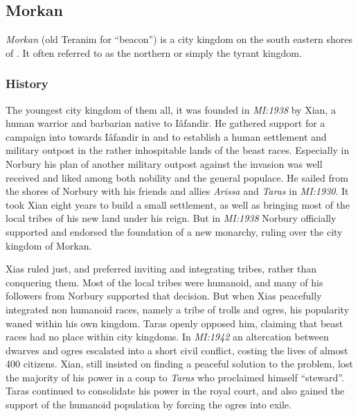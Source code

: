 \subsection{Morkan}
\label{sec:Morkan}


\emph{Morkan} (old Teranim for ``beacon'') is a city kingdom on the south
eastern shores of . It often referred to as the northern
or simply the tyrant kingdom.

\subsubsection{History}

The youngest city kingdom of them all, it was founded in \emph{MI:1938} by
Xian, a human warrior and barbarian native to Iâfandir. He gathered support
for a campaign into towards Iâfandir in  and
 to establish a human settlement and military outpost in
the rather inhospitable lands of the beast races. Especially in Norbury his
plan of another military outpost against the invasion was well received and
liked among both nobility and the general populace. He sailed from the shores
of Norbury with his friends and allies \emph{Arissa} and \emph{Taras} in
\emph{MI:1930}. It took Xian eight years to build a small settlement, as well
as bringing most of the local tribes of his new land under his reign. But in
\emph{MI:1938} Norbury officially supported and endorsed the foundation of a
new monarchy, ruling over the city kingdom of Morkan.

Xias ruled just, and preferred inviting and integrating tribes, rather than
conquering them. Most of the local tribes were humanoid, and many of his
followers from Norbury supported that decision. But when Xias peacefully
integrated non humanoid races, namely a tribe of trolls and ogres, his
popularity waned within his own kingdom. Taras openly opposed him, claiming
that beast races had no place within city kingdoms. In \emph{MI:1942} an
altercation between dwarves and ogres escalated into a short civil conflict,
costing the lives of almost 400 citizens. Xian, still insisted on finding a
peaceful solution to the problem, lost the majority of his power in a coup to
\emph{Taras} who proclaimed himself ``steward''. Taras continued to
consolidate his power in the royal court, and also gained the support of the
humanoid population by forcing the ogres into exile.

